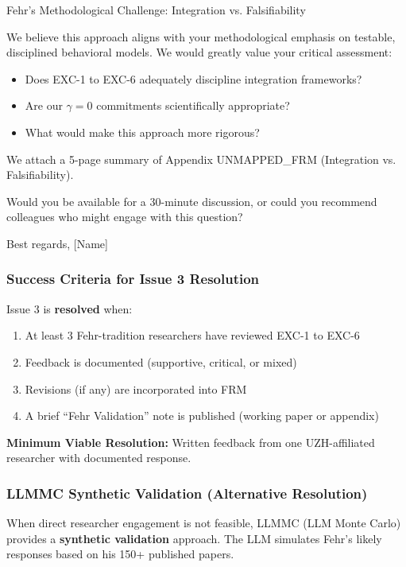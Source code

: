 \begin{chapter}{Fehr's Methodological Challenge: Integration vs. Falsifiability}
\begin{tcolorbox}[colback=gray!5!white,colframe=gray!75!black,title=\textbf{Email Draft for Fehr-Tradition Researchers}]
We believe this approach aligns with your methodological emphasis on testable, disciplined behavioral models. We would greatly value your critical assessment:
\begin{itemize}[noitemsep]
    \item Does EXC-1 to EXC-6 adequately discipline integration frameworks?
    \item Are our $\gamma = 0$ commitments scientifically appropriate?
    \item What would make this approach more rigorous?
\end{itemize}

We attach a 5-page summary of Appendix UNMAPPED_FRM (Integration vs. Falsifiability).

Would you be available for a 30-minute discussion, or could you recommend colleagues who might engage with this question?

Best regards, [Name]
\end{tcolorbox}

\subsubsection{Success Criteria for Issue 3 Resolution}

Issue 3 is \textbf{resolved} when:
\begin{enumerate}[noitemsep]
    \item At least 3 Fehr-tradition researchers have reviewed EXC-1 to EXC-6
    \item Feedback is documented (supportive, critical, or mixed)
    \item Revisions (if any) are incorporated into FRM
    \item A brief ``Fehr Validation'' note is published (working paper or appendix)
\end{enumerate}

\textbf{Minimum Viable Resolution:} Written feedback from one UZH-affiliated researcher with documented response.

\subsubsection{LLMMC Synthetic Validation (Alternative Resolution)}
\label{sec:llmmc-fehr}

When direct researcher engagement is not feasible, LLMMC (LLM Monte Carlo) provides a \textbf{synthetic validation} approach. The LLM simulates Fehr's likely responses based on his 150+ published papers.


\end{chapter}
